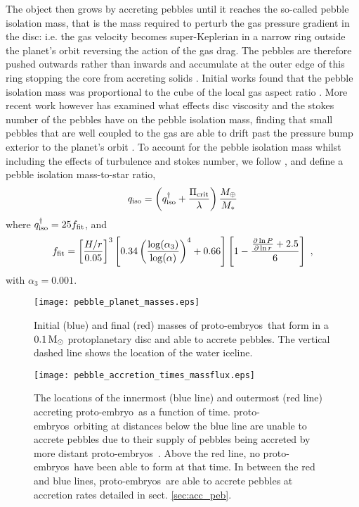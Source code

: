 \documentclass[a4paper,fleqn,usenatbib]{mnras}
\newcommand{\msun}{{\, {\rm M}_{\odot}}}
\newcommand{\emb}{{{proto-embryo~}}}
\newcommand{\embs}{{{proto-embryos~}}}
\begin{document}
The object then grows by accreting pebbles until it reaches the so-called pebble isolation mass, that is the mass required to perturb the gas pressure gradient in the disc: i.e. the gas velocity becomes super-Keplerian in a narrow ring outside the planet's orbit reversing the action of the gas drag.
The pebbles are therefore pushed outwards rather than inwards and accumulate at the outer edge of this ring stopping the core from accreting solids \citep{PaardekooperMellema06,Rice06}.
Initial works found that the pebble isolation mass was proportional to the cube of the local gas aspect ratio \citep{Lambrechts14}.
More recent work however has examined what effects disc viscosity and the stokes number of the pebbles have on the pebble isolation mass, finding that small pebbles that are well coupled to the gas are able to drift past the pressure bump exterior to the planet's orbit \citep{Ataiee18,Bitsch18}.
To account for the pebble isolation mass whilst including the effects of turbulence and stokes number, we follow \citet{Bitsch18}, and define a pebble isolation mass-to-star ratio,
\begin{equation}
q_{\rm iso} = \left(q_{\rm iso}^{\dagger} + \frac{\Pi_{\rm crit}}{\lambda} \right) \frac{M_{\oplus}}{M_*}
\end{equation}
where $q_{\rm iso}^\dagger  = 25 f_{\rm fit}$, and
\begin{equation}
\label{eq:ffit}
 f_{\rm fit} = \left[\frac{H/r}{0.05}\right]^3 \left[ 0.34 \left(\frac{\log(\alpha_3)}{\log(\alpha)}\right)^4 + 0.66 \right] \left[1-\frac{\frac{\partial\ln P}{\partial\ln r } +2.5}{6} \right] \ ,
\end{equation}
with $\alpha_3 = 0.001$.

\begin{figure}
\centering
\texttt{[image: pebble\_planet\_masses.eps]}
\caption{Initial (blue) and final (red) masses of \embs that form in a $0.1 \msun$ protoplanetary disc and able to accrete pebbles. The vertical dashed line shows the location of the water iceline.}
\label{fig:pebble_masses}
\end{figure}

\begin{figure}
\centering
\texttt{[image: pebble\_accretion\_times\_massflux.eps]}
\caption{The locations of the innermost (blue line) and outermost (red line) accreting \emb as a function of time. \embs orbiting at distances below the blue line are unable to accrete pebbles due to their supply of pebbles being accreted by more distant \embs. Above the red line, no \embs have been able to form at that time. In between the red and blue lines, \embs are able to accrete pebbles at
accretion rates detailed in sect. \ref{sec:acc_peb}.}
\label{fig:pebble_accretion_time}
\end{figure}
\end{document}
